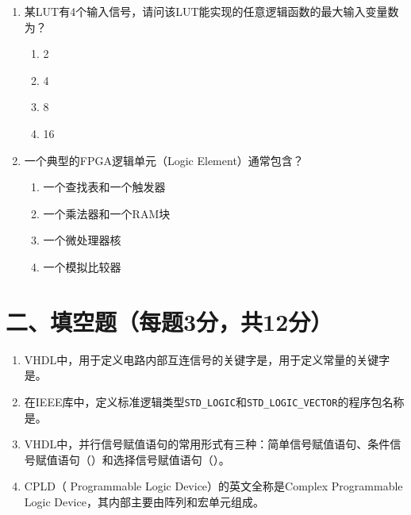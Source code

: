 \begin{enumerate}[label=\arabic*.]
\item 某LUT有4个输入信号，请问该LUT能实现的任意逻辑函数的最大输入变量数为？
\begin{enumerate}[label=\Alph*.]
  \item 2
  \item 4
  \item 8
  \item 16
\end{enumerate}

\item 一个典型的FPGA逻辑单元（Logic Element）通常包含？
\begin{enumerate}[label=\Alph*.]
  \item 一个查找表和一个触发器
  \item 一个乘法器和一个RAM块
  \item 一个微处理器核
  \item 一个模拟比较器
\end{enumerate}

\end{enumerate}

\section*{二、填空题（每题3分，共12分）}

\begin{enumerate}[label=\arabic*.]

\item VHDL中，用于定义电路内部互连信号的关键字是\underline{\hspace{3cm}}，用于定义常量的关键字是\underline{\hspace{3cm}}。

\item 在IEEE库中，定义标准逻辑类型\texttt{STD\_LOGIC}和\texttt{STD\_LOGIC\_\-VECTOR}的程序包名称是\underline{\hspace{4cm}}。

\item VHDL中，并行信号赋值语句的常用形式有三种：简单信号赋值语句、条件信号赋值语句（\underline{\hspace{2cm}}）和选择信号赋值语句（\underline{\hspace{2cm}}）。

\item CPLD（\underline{\hspace{3cm}} Programmable Logic Device）的英文全称是Complex Programmable Logic Device，其内部主要由\underline{\hspace{3cm}}阵列和宏单元组成。

\end{enumerate}

